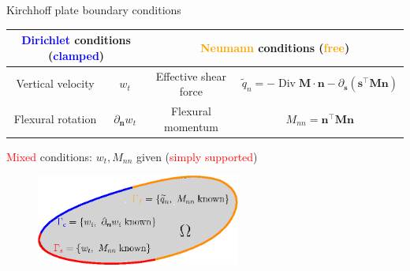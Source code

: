 \documentclass[aspectratio=169]{ISAE-Beamer}
\DeclareMathOperator*{\Div}{Div}
\begin{document}
\begin{frame}{Kirchhoff plate boundary conditions}

\begin{table}
	\centering
	\begin{tabular}{cc|cc}
		\hline 
		\multicolumn{2}{c}{\textcolor{blue}{Dirichlet} conditions (\textcolor{blue}{clamped})}&  \multicolumn{2}{c}{\textcolor{orange}{Neumann} conditions (\textcolor{orange}{free})} \\ 
		\hline 
		Vertical velocity  & $w_t$ & Effective shear force  & $\widetilde{q}_n = -\Div \bm{M} \cdot \bm{n} - \partial_{\bm{s}} (\bm{s}^\top \bm{M} \bm{n})$ \\ 
		Flexural rotation  & $\partial_{\bm{n}} w_t $  & Flexural momentum & $M_{nn} = \bm{n}^\top\bm{M}\bm{n}$ \\  
		\hline 
	\end{tabular}
\end{table}
\textcolor{red}{Mixed} conditions: $w_t, M_{nn}$ given (\textcolor{red}{simply supported})
\begin{figure}[tb]
	\centering
	\includegraphics[width=0.6\textwidth]{part_2/kirchh_plate_bcs.eps}
\end{figure}
		
\end{frame}
\end{document}
